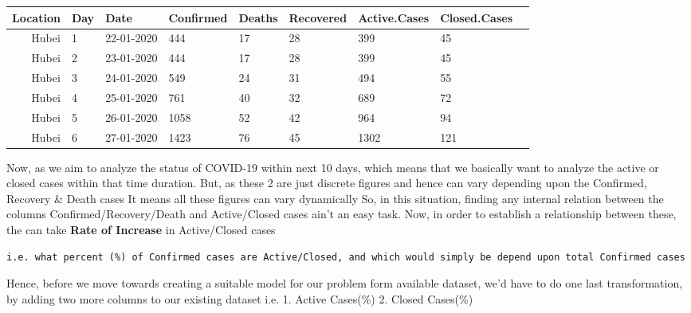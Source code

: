 \documentclass[11pt]{article}
\begin{document}
    
    \begin{tabular}{r|llllllll}
 Location & Day & Date & Confirmed & Deaths & Recovered & Active.Cases & Closed.Cases\\
\hline
	 Hubei      & 1          & 22-01-2020 &  444       & 17         & 28         &  399       &  45       \\
	 Hubei      & 2          & 23-01-2020 &  444       & 17         & 28         &  399       &  45       \\
	 Hubei      & 3          & 24-01-2020 &  549       & 24         & 31         &  494       &  55       \\
	 Hubei      & 4          & 25-01-2020 &  761       & 40         & 32         &  689       &  72       \\
	 Hubei      & 5          & 26-01-2020 & 1058       & 52         & 42         &  964       &  94       \\
	 Hubei      & 6          & 27-01-2020 & 1423       & 76         & 45         & 1302       & 121       \\
\end{tabular}


    
     Now, as we aim to analyze the status of COVID-19 within next 10 days,
which means that we basically want to analyze the active or closed cases
within that time duration. But, as these 2 are just discrete figures and
hence can vary depending upon the Confirmed, Recovery \& Death cases It
means all these figures can vary dynamically So, in this situation,
finding any internal relation between the columns
Confirmed/Recovery/Death and Active/Closed cases ain't an easy task.
Now, in order to establish a relationship between these, the can take
\textbf{Rate of Increase} in Active/Closed cases

\begin{verbatim}
i.e. what percent (%) of Confirmed cases are Active/Closed, and which would simply be depend upon total Confirmed cases
\end{verbatim}

 Hence, before we move towards creating a suitable model for our problem
form available dataset, we'd have to do one last transformation, by
adding two more columns to our existing dataset i.e. 1. Active Cases(\%)
2. Closed Cases(\%) 
\end{document}
